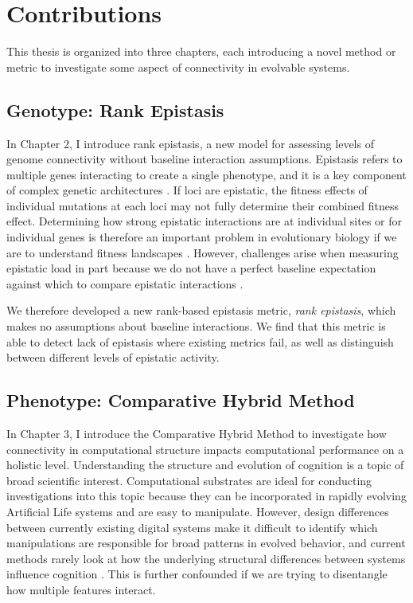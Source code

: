 \section{Contributions}

This thesis is organized into three chapters, each introducing a novel method or metric to investigate some aspect of connectivity in evolvable systems. 

\subsection{Genotype: Rank Epistasis}

In Chapter 2, I introduce rank epistasis, a new model for assessing levels of genome connectivity without baseline interaction assumptions. 
Epistasis refers to multiple genes interacting to create a single phenotype, and it is a key component of complex genetic architectures \citep{khan_negative_2011, weinreich_should_2013, wiser_long-term_2013, gupta_shared_2016, payne_causes_2019}. 
If loci are epistatic, the fitness effects of individual mutations at each loci may not fully determine their combined fitness effect. 
Determining how strong epistatic interactions are at individual sites or for individual genes is therefore an important problem in evolutionary biology if we are to understand fitness landscapes \citep{cordell_epistasis_2002, weinreich_should_2013}. 
However, challenges arise when measuring epistatic load in part because we do not have a perfect baseline expectation against which to compare epistatic interactions \citep{puniyani_meaning_2004}.

We therefore developed a new rank-based epistasis metric, \textit{rank epistasis}, which makes no assumptions about baseline interactions.
We find that this metric is able to detect lack of epistasis where existing metrics fail, as well as distinguish between different levels of epistatic activity.

\subsection{Phenotype: Comparative Hybrid Method}

In Chapter 3, I introduce the Comparative Hybrid Method to investigate how connectivity in computational structure impacts computational performance on a holistic level. 
Understanding the structure and evolution of cognition is a topic of broad scientific interest. 
Computational substrates are ideal for conducting investigations into this topic because they can be incorporated in rapidly evolving Artificial Life systems and are easy to manipulate.
However, design differences between currently existing digital systems make it difficult to identify which manipulations are responsible for broad patterns in evolved behavior, and current methods rarely look at how the underlying structural differences between systems influence cognition \citep{hintze_evolutionary_2019, real_automl-zero_2020}. 
This is further confounded if we are trying to disentangle how multiple features interact.


